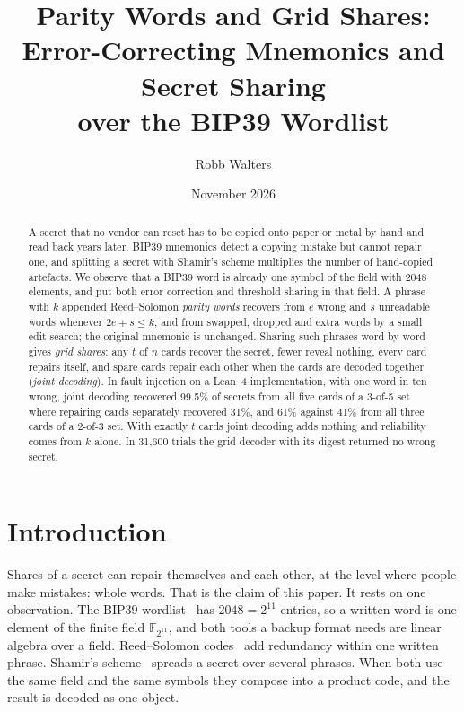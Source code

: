 \documentclass[numeric]{anvil-paper}
\title{Parity Words and Grid Shares:\\ Error-Correcting Mnemonics and Secret Sharing\\ over the BIP39 Wordlist}
\author{Robb Walters}
\date{November 2026}
\newcommand{\F}{\mathbb{F}}
\begin{document}
\maketitle

\begin{abstract}
A secret that no vendor can reset has to be copied onto paper or metal by hand
and read back years later. BIP39 mnemonics detect a copying mistake but cannot
repair one, and splitting a secret with Shamir's scheme multiplies the number of
hand-copied artefacts. We observe that a BIP39 word is already one symbol of the
field with 2048 elements, and put both error correction and threshold sharing
in that field. A phrase with $k$ appended Reed--Solomon \emph{parity words}
recovers from $e$ wrong and $s$ unreadable words whenever $2e+s\le k$, and from
swapped, dropped and extra words by a small edit search; the original mnemonic
is unchanged. Sharing such phrases word by word gives \emph{grid shares}: any
$t$ of $n$ cards recover the secret, fewer reveal nothing, every card repairs
itself, and spare cards repair each other when the cards are decoded together
(\emph{joint decoding}). In fault injection on a Lean~4
implementation, with one word in ten wrong, joint decoding recovered 99.5\% of
secrets from all five cards of a 3-of-5 set where repairing cards separately
recovered 31\%, and 61\% against 41\% from all three cards of a 2-of-3 set.
With exactly $t$ cards joint decoding adds nothing and reliability comes from
$k$ alone. In 31{,}600 trials the grid decoder with its digest returned no wrong secret.
\end{abstract}

\section{Introduction}
\label{sec:intro}

Shares of a secret can repair themselves and each other, at the level where
people make mistakes: whole words. That is the claim of this paper. It rests on
one observation. The BIP39 wordlist~\citep{bip39} has $2048 = 2^{11}$ entries,
so a written word is one element of the finite field $\F_{2^{11}}$, and both
tools a backup format needs are linear algebra over a field. Reed--Solomon
codes~\citep{reed1960polynomial} add redundancy within one written phrase.
Shamir's scheme~\citep{shamir1979how} spreads a secret over several phrases.
When both use the same field and the same symbols they compose into a product
code, and the result is decoded as one object.
\end{document}
